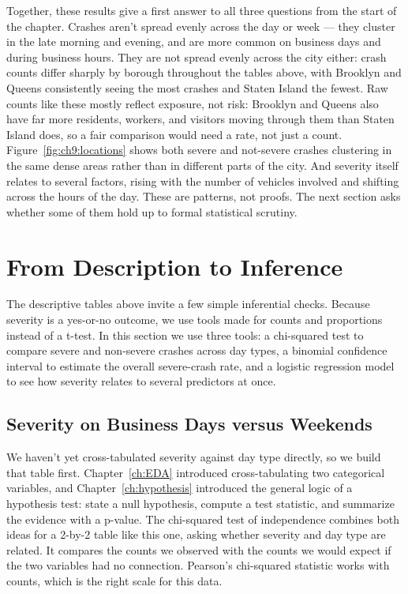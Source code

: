 Together, these results give a first answer to all three questions
from the start of the chapter. Crashes aren't spread evenly across
the day or week --- they cluster in the late morning and evening, and
are more common on business days and during business hours. They are
not spread evenly across the city either: crash counts differ sharply
by borough throughout the tables above, with Brooklyn and Queens
consistently seeing the most crashes and Staten Island the fewest.
Raw counts like these mostly reflect exposure, not risk: Brooklyn and
Queens also have far more residents, workers, and visitors moving
through them than Staten Island does, so a fair comparison would need
a rate, not just a count. Figure~\ref{fig:ch9:locations} shows both
severe and not-severe crashes clustering in the same dense areas
rather than in different parts of the city. And severity itself
relates to several factors, rising with the number of
vehicles involved and shifting across the hours of the day. These are
patterns, not proofs. The next section asks whether some of them hold
up to formal statistical scrutiny.

\section{From Description to Inference}

The descriptive tables above invite a few simple inferential checks.
Because severity is a yes-or-no outcome, we use tools made for counts
and proportions instead of a t-test. In this section we use three
tools: a chi-squared test to compare severe and non-severe crashes
across day types, a binomial confidence interval to estimate the
overall severe-crash rate, and a logistic regression model to see how
severity relates to several predictors at once.

\subsection{Severity on Business Days versus Weekends}

We haven't yet cross-tabulated severity against day type directly,
so we build that table first. Chapter~\ref{ch:EDA} introduced
cross-tabulating two categorical variables, and
Chapter~\ref{ch:hypothesis} introduced the general logic of a
hypothesis test: state a null hypothesis, compute a test statistic,
and summarize the evidence with a p-value. The chi-squared test of
independence combines both
ideas for a 2-by-2 table like this one, asking whether severity and
day type are related. It compares the counts we observed with the
counts we would expect if the two variables had no connection.
Pearson's chi-squared
statistic works with counts,
which is the right scale for this data.

